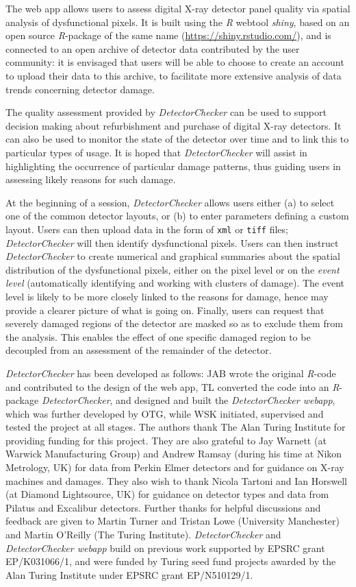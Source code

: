 \documentclass[11pt,a4paper]{article}
\newcommand{\DetectorChecker}{\emph{DetectorChecker}\xspace}
\newcommand{\DetectorCheckerWebApp}{\emph{DetectorChecker webapp}\xspace}
\newcommand{\Rsoftware}{\emph{R}\xspace}
\begin{document}
The web app allows users to assess digital X-ray 
detector panel quality via spatial analysis of dysfunctional pixels.
It is built using the \Rsoftware webtool \emph{shiny}, based on an open source \Rsoftware-package of the same name (\url{https://shiny.rstudio.com/}),
and is
connected to an open archive of detector data contributed by the user community:
it is envisaged that users will be able to choose to create an account to upload their data to this archive,
to facilitate more extensive analysis of data trends concerning detector damage.

The quality assessment provided by \DetectorChecker can be used to support decision making 
about refurbishment and purchase of digital X-ray detectors. 
It can also be used to monitor the state of the detector over time and to link this to particular types of usage.
It is hoped that \DetectorChecker will assist in highlighting the occurrence of particular damage patterns, thus guiding
users in assessing likely reasons for such damage.

At the beginning of a session, 
\DetectorChecker allows users either (a) to select one of the common detector layouts,
or (b) to enter parameters defining a custom layout. 
Users can then upload data in the form of \texttt{xml} or \texttt{tiff} files;
\DetectorChecker will then identify dysfunctional pixels.
Users can then instruct
\DetectorChecker to create numerical and graphical summaries 
about the spatial distribution of the dysfunctional pixels,
either on the pixel level or on the \emph{event level}
(automatically identifying and working with clusters of damage). The event level is likely to be more
closely linked to the reasons for damage, hence may provide a clearer picture 
of what is going on.
Finally, users can request that severely damaged regions of the detector are masked so as 
to exclude them from
the analysis. This enables the effect of one specific damaged region 
to be decoupled from
an assessment of the remainder of the detector.

\DetectorChecker has been developed as follows:
JAB wrote the original \Rsoftware-code and contributed to the design of the web app, 
TL converted the code into an \Rsoftware-package
\DetectorChecker,
and designed and built the 
\DetectorCheckerWebApp, 
which was further developed by OTG, while WSK initiated, supervised and tested the project at all stages. 
% 
The authors thank The Alan Turing Institute for providing funding for this project. They are also grateful to Jay Warnett (at Warwick Manufacturing Group) and Andrew Ramsay (during his time at Nikon Metrology, UK) 
for data from Perkin Elmer detectors and for guidance on X-ray machines and damages. They also wish to thank Nicola Tartoni and Ian Horswell (at Diamond Lightsource, UK) for guidance on detector types and data from Pilatus and Excalibur detectors. Further thanks for helpful discussions and feedback are given
to Martin Turner and Tristan Lowe (University Manchester) 
and Martin O'Reilly (The Turing Institute).
\DetectorChecker and \DetectorCheckerWebApp build on previous work supported by EPSRC grant EP/K031066/1, and were funded by Turing seed fund projects awarded by the Alan Turing Institute under EPSRC grant EP/N510129/1.
\end{document}
